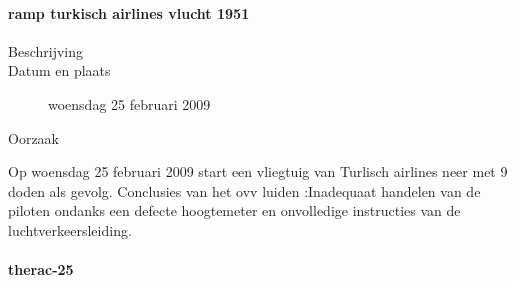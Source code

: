 \cite{aviationsafety04101992airplaneCrashBijlmer}

\paragraph{ramp turkisch airlines vlucht 1951}

\begin{description}
	\item[Beschrijving]
	\item[Datum en plaats] woensdag 25 februari 2009
	\item[Oorzaak]
\end{description}
Op woensdag 25 februari 2009 start een vliegtuig van Turlisch airlines neer met 9 doden als gevolg.
Conclusies van het ovv luiden :Inadequaat handelen van de piloten ondanks een defecte hoogtemeter en onvolledige instructies van de luchtverkeersleiding.

\cite{catsr25022009Boeing737AmsterdamCrash}

\cite{zuilen23022019Tijdlijnpoldercrash}
\cite{wikinews04032009techfoutailines1951}
\cite{luchtvaartnieuws21012020boeing737conclusies}
\cite{adformatie280220209communicatiegebreken}
\cite{spinnael25022009onderzoekpolderbaancrash}
\cite{crashTurkishAirlines}
\cite{flightradar24}
\cite{flightstatstracker}


\paragraph{therac-25}


